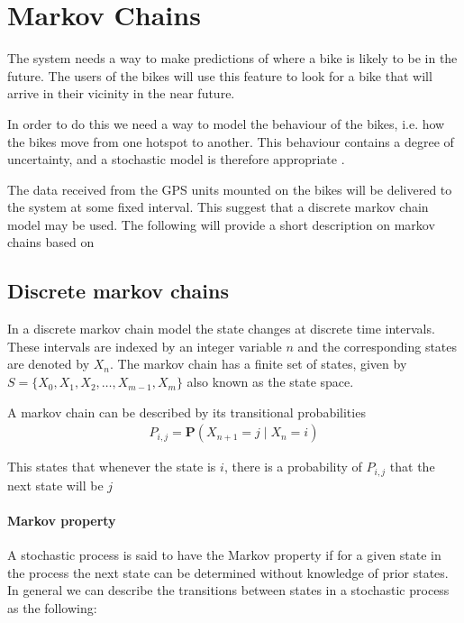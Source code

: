 \section{Markov Chains}\label{markov}
The system needs a way to make predictions of where a bike is likely to be in the future.
The users of the bikes will use this feature to look for a bike that will arrive in their vicinity in the near future.

In order to do this we need a way to model the behaviour of the bikes, i.e. how the bikes move from one hotspot to another.
This behaviour contains a degree of uncertainty, and a stochastic model is therefore appropriate \cite[p. ~296]{bertsekas2002introduction}.

The data received from the GPS units mounted on the bikes will be delivered to the system at some fixed interval.
This suggest that a discrete markov chain model may be used.
The following will provide a short description on markov chains based on \citet[chapter 7]{bertsekas2002introduction}

\subsection{Discrete markov chains}\label{markov:intro}
In a discrete markov chain model the state changes at discrete time intervals. 
These intervals are indexed by an integer variable $ n $ and the corresponding states are denoted by $ X_n $.
The markov chain has a finite set of states, given by $S = \{X_0, X_1, X_2,\dots, X_{m-1}, X_m\}$ also known as the state space.

A markov chain can be described by its transitional probabilities \begin{align}
P_{i,j} = \mathbf{P} (X_{n+1} = j\mid X_n = i)
\end{align}

This states that whenever the state is $ i $, there is a probability of $ P_{i,j}  $ that the next state will be $ j $

\paragraph{Markov property}\label{markov:property}
A stochastic process is said to have the Markov property if for a given state in the process the next state can be determined without knowledge of prior states.
In general we can describe the transitions between states in a stochastic process as the following:

